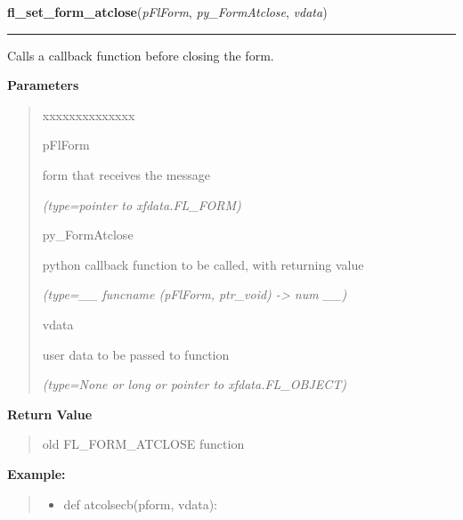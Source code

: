 \hspace{.8\funcindent}\begin{boxedminipage}{\funcwidth}

    \raggedright \textbf{fl\_set\_form\_atclose}(\textit{pFlForm}, \textit{py\_FormAtclose}, \textit{vdata})

    \vspace{-1.5ex}

    \rule{\textwidth}{0.5\fboxrule}
\setlength{\parskip}{2ex}
    Calls a callback function before closing the form.

\setlength{\parskip}{1ex}
      \textbf{Parameters}
      \vspace{-1ex}

      \begin{quote}
        \begin{Ventry}{xxxxxxxxxxxxxx}

          \item[pFlForm]

          form that receives the message

            {\it (type=pointer to xfdata.FL\_FORM)}

          \item[py\_FormAtclose]

          python callback function to be called, with returning value

            {\it (type=\_\_ funcname (pFlForm, ptr\_void) -{\textgreater} num \_\_)}

          \item[vdata]

          user data to be passed to function

            {\it (type=None or long or pointer to xfdata.FL\_OBJECT)}

        \end{Ventry}

      \end{quote}

      \textbf{Return Value}
    \vspace{-1ex}

      \begin{quote}
      old FL\_FORM\_ATCLOSE function

      \end{quote}

\textbf{Example:}
\begin{quote}
  \begin{itemize}

  \item
    \setlength{\parskip}{0.6ex}
def atcolsecb(pform, vdata):




\end{itemize}
\end{quote}
\end{boxedminipage}
